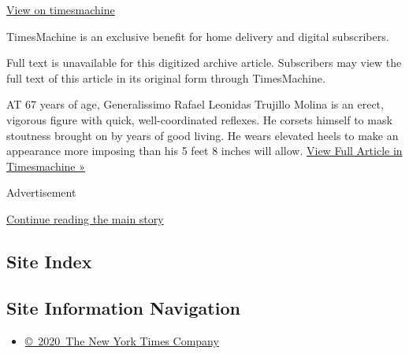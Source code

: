 \href{http://timesmachine.nytimes3xbfgragh.onion/timesmachine/1959/07/06/89218922.html}{View
on timesmachine}

TimesMachine is an exclusive benefit for home delivery and digital
subscribers.

Full text is unavailable for this digitized archive article. Subscribers
may view the full text of this article in its original form through
TimesMachine.

AT 67 years of age, Generalissimo Rafael Leonidas Trujillo Molina is an
erect, vigorous figure with quick, well-coordinated reflexes. He corsets
himself to mask stoutness brought on by years of good living. He wears
elevated heels to make an appearance more imposing than his 5 feet 8
inches will allow.
\href{http://timesmachine.nytimes3xbfgragh.onion/timesmachine/1959/07/06/89218922.html}{View
Full Article in Timesmachine »}

Advertisement

\protect\hyperlink{after-bottom}{Continue reading the main story}

\hypertarget{site-index}{%
\subsection{Site Index}\label{site-index}}

\hypertarget{site-information-navigation}{%
\subsection{Site Information
Navigation}\label{site-information-navigation}}

\begin{itemize}
\tightlist
\item
  \href{https://help.nytimes3xbfgragh.onion/hc/en-us/articles/115014792127-Copyright-notice}{©~2020~The
  New York Times Company}
\end{itemize}

